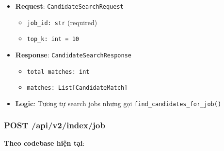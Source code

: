 \begin{itemize}
    \item \textbf{Request}: \texttt{CandidateSearchRequest}
    \begin{itemize}
        \item \texttt{job\_id: str} (required)
        \item \texttt{top\_k: int = 10}
    \end{itemize}
    
    \item \textbf{Response}: \texttt{CandidateSearchResponse}
    \begin{itemize}
        \item \texttt{total\_matches: int}
        \item \texttt{matches: List[CandidateMatch]}
    \end{itemize}
    
    \item \textbf{Logic}: Tương tự search jobs nhưng gọi \texttt{find\_candidates\_for\_job()}
\end{itemize}

\subsubsection{POST /api/v2/index/job}

\textbf{Theo codebase hiện tại}:

